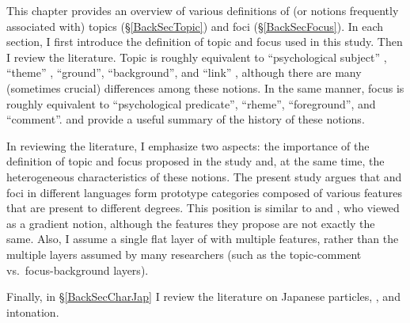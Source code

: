 This chapter provides an overview of various definitions of (or notions frequently associated with) topics (\S \ref{BackSecTopic}) and foci (\S \ref{BackSecFocus}).
In each section,
I first introduce the definition of topic and focus used in this study.
Then I review the literature.
Topic is roughly equivalent to ``psychological subject'' \cite{gabelentz69}, ``theme'' \cite[e.g.,][]{danes70,halliday04}, ``ground'', ``background'', and ``link'' \cite{vallduvi94},
although there are many (sometimes crucial) differences among these notions.
In the same manner,
focus is roughly equivalent to ``psychological predicate'', ``rheme'', ``foreground'', and ``comment''.
 and  provide a useful summary of the history of these notions.

In reviewing the literature,
I emphasize two aspects:
the importance of the definition of topic and focus proposed in the study and, at the same time,
the heterogeneous characteristics of these notions.
The present study argues that  and foci in different languages form prototype categories composed of various features that are present to different degrees. This position is similar to  and ,
who viewed  as a gradient notion,
although the features they propose are not exactly the same.
Also, I assume a single flat layer of  with multiple features, rather than the multiple layers assumed by many researchers (such as the topic-comment vs.~focus-background layers).


Finally, in \S \ref{BackSecCharJap} 
I review the literature on Japanese particles, , and intonation.


